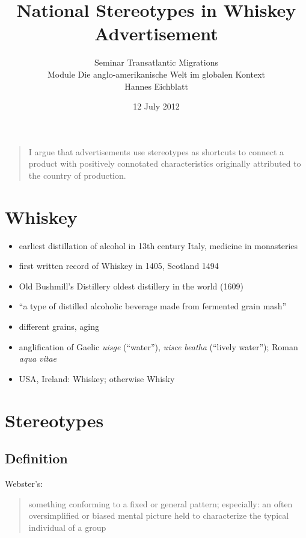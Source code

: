 \documentclass[12pt]{article}
\title{National Stereotypes in Whiskey Advertisement}
\author{Seminar Transatlantic Migrations \\ Module Die anglo-amerikanische Welt im globalen Kontext \\ Hannes Eichblatt}
\date{12 July 2012}
\begin{document}
\maketitle

\begin{quotation}
I argue that advertisements use stereotypes as shortcuts to connect a product with positively connotated characteristics originally attributed to the country of production.
\end{quotation}

\section{Whiskey}

\begin{itemize}
 \item earliest distillation of alcohol in 13th century Italy, medicine in monasteries
 \item first written record of Whiskey in 1405, Scotland 1494
 \item Old Bushmill's Distillery oldest distillery in the world (1609)
\end{itemize}

\begin{itemize}
 \item ``a type of distilled alcoholic beverage made from fermented grain mash''
 \item different grains, aging
\end{itemize}

\begin{itemize}
 \item anglification of Gaelic \emph{uisge} (``water''), \emph{uisce beatha} (``lively water''); Roman \emph{aqua vitae}
 \item USA, Ireland: Whiskey; otherwise Whisky
\end{itemize}

\section{Stereotypes}

\subsection{Definition}

Webster's:
 \begin{quotation}
  something conforming to a fixed or general pattern; especially: an often oversimplified or biased mental picture held to characterize the typical individual of a group
 \end{quotation}
\end{document}
